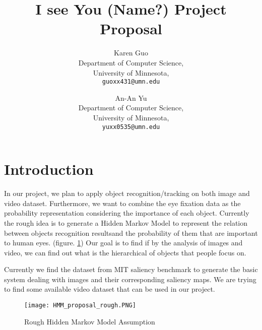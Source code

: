 \documentclass[12pt]{article}
\begin{document}
\title{\bf I see You (Name?) Project Proposal}
\author{
Karen Guo \\
Department of Computer Science, \\
University of Minnesota, \\
\texttt{guoxx431@umn.edu}
\and
An-An Yu \\
Department of Computer Science, \\
University of Minnesota, \\
\texttt{yuxx0535@umn.edu}
}
\maketitle


\section{Introduction}
In our project, we plan to apply object recognition/tracking on both image and video dataset. Furthermore, we want to combine the eye fixation data as the probability representation considering the importance of each object. Currently the rough idea is to generate a Hidden Markov Model to represent the relation between objects recognition resultsand the probability of them that are important to human eyes. (figure. \ref{HMM}) Our goal is to find if by the analysis of images and video, we can find out what is the hierarchical of objects that people focus on.\par
Currently we find the dataset from MIT saliency benchmark \cite{mit-saliency-benchmark} to generate the basic system dealing with images and their corresponding saliency maps. We are trying to find some available video dataset that can be used in our project.
\begin{figure}[h!]
\centering
\texttt{[image: HMM\_proposal\_rough.PNG]}
\caption{Rough Hidden Markov Model Assumption}
\label{HMM}
\end{figure}
\end{document}
